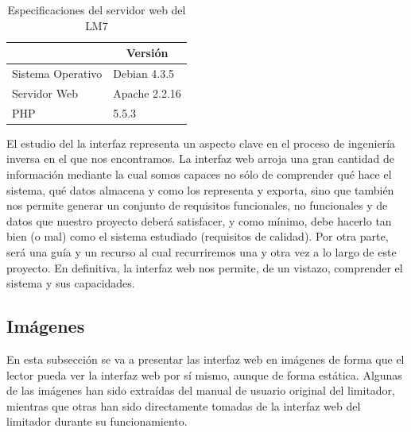 \begin{table}[h]
    \centering
    \begin{tabular}{|l|l|}
        \hline
        \rowcolor[HTML]{ECF4FF}
        \multicolumn{1}{|c|}{\cellcolor[HTML]{ECF4FF}\textbf{Tecnología}} & \multicolumn{1}{c|}{\cellcolor[HTML]{ECF4FF}\textbf{Versión}} \\ \hline
        Sistema Operativo                                                 & Debian 4.3.5                                                  \\ \hline
        Servidor Web                                                      & Apache 2.2.16                                                 \\ \hline
        PHP                                                               & 5.5.3                                                         \\ \hline
    \end{tabular}
    \caption{Especificaciones del servidor web del \gls{LM7}}
    \label{tab:lm7_lamp_specs}
\end{table}


El estudio del la interfaz representa un aspecto clave en el proceso de ingeniería inversa en el que nos encontramos. La interfaz web arroja una gran cantidad de información mediante la cual somos capaces no sólo de comprender qué hace el sistema, qué datos almacena y como los representa y exporta, sino que también nos permite generar un conjunto de requisitos funcionales, no funcionales y de datos que nuestro proyecto deberá satisfacer, y como mínimo, debe hacerlo tan bien (o mal) como el sistema estudiado (requisitos de calidad). Por otra parte, será una guía y un recurso al cual recurriremos una y otra vez a lo largo de este proyecto. En definitiva, la interfaz web nos permite, de un vistazo, comprender el sistema y sus capacidades.

\subsection{Imágenes}

En esta subsección se va a presentar las interfaz web en imágenes de forma que el lector pueda ver la interfaz web por sí mismo, aunque de forma estática. Algunas de las imágenes han sido extraídas del manual de usuario original del limitador, mientras que otras han sido directamente tomadas de la interfaz web del limitador durante su funcionamiento.

